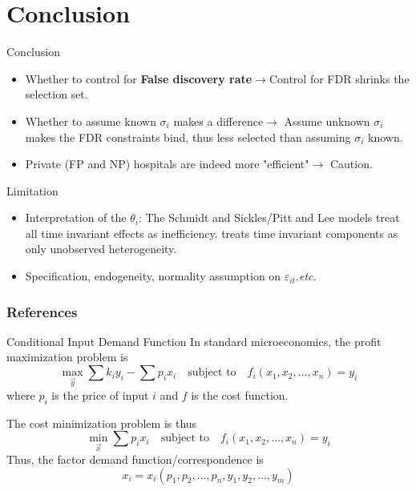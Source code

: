 \documentclass[10pt,mathserif,aspectratio=169]{beamer}
\begin{document}
\section{Conclusion}

\begin{frame}{Conclusion}
  \begin{itemize}
    \item Whether to control for \textbf{False discovery rate}$\to$Control for FDR
          shrinks the selection set.
    \item Whether to assume known $\sigma_i$ makes a difference$\to$ Assume unknown
          $\sigma_i$ makes the FDR constraints bind, thus less selected than assuming
          $\sigma_i$ known.
    \item Private (FP and NP) hospitals are indeed more "efficient"$\to$ Caution.
  \end{itemize}
\end{frame}

\begin{frame}[label=limitation]{Limitation}
  \begin{itemize}\itemsep=12pt
    \item Interpretation of the $\theta_i$: The Schmidt and Sickles/Pitt and Lee models
          treat all time invariant effects as inefficiency. \citet{greene2005fixed}
          treats time invariant components as only unobserved heterogeneity.
    \item Specification, endogeneity, normality assumption on
          $\varepsilon_{it}$.\textit{etc.} \hyperlink{normality}{} \end{itemize}
\end{frame}

\begin{frame}[allowframebreaks]
  \frametitle{References}
  
  
\end{frame}

\appendix

\begin{frame}[label=inputdemand]{Conditional Input Demand Function}
  In standard microeconomics, the profit maximization problem is
  \begin{equation*}
    \max_{\vec{y}} \sum k_i y_i - \sum p_i x_i \quad \text{subject to} \quad f_i(x_1, x_2, \ldots, x_n) = y_i
  \end{equation*}
  where $p_i$ is the price of input $i$ and $f$ is the cost function.

  The cost minimization problem is thus
  \begin{equation*}
    \min_{\vec{x}} \sum p_i x_i \quad \text{subject to} \quad f_i(x_1, x_2, \ldots, x_n) = y_i
  \end{equation*}
  Thus, the factor demand function/correspondence is
  \begin{equation*}
    x_i = x_i(p_1, p_2, \ldots, p_n, y_1, y_2, \ldots, y_m)
  \end{equation*}
  \hyperlink{literature}{}
\end{frame}
\end{document}
